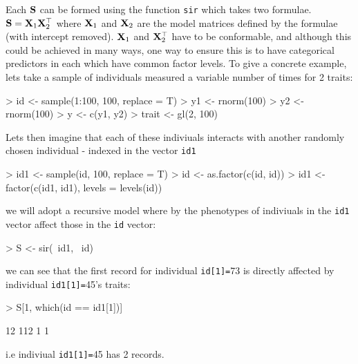 \documentclass{article}
\begin{document}
Each ${\bf S}$ can be formed using the function \texttt{sir} which takes two formulae. ${\bf S} = {\bf X}_{1}{\bf X}_{2}^{\top}$ where ${\bf X}_{1}$ and ${\bf X}_{2}$ are the model matrices defined by the formulae (with intercept removed).  ${\bf X}_{1}$ and ${\bf X}_{2}^{\top}$ have to be conformable, and although this could be achieved in many ways, one way to ensure this is to have categorical predictors in each which have common factor levels.  To give a concrete example, lets take a sample of individuals measured a variable number of times for 2 traits: 

\begin{Schunk}
\begin{Sinput}
> id <- sample(1:100, 100, replace = T)
> y1 <- rnorm(100)
> y2 <- rnorm(100)
> y <- c(y1, y2)
> trait <- gl(2, 100)
\end{Sinput}
\end{Schunk}


Lets then imagine that each of these indiviuals interacts with another randomly chosen individual - indexed in the vector \texttt{id1}

\begin{Schunk}
\begin{Sinput}
> id1 <- sample(id, 100, replace = T)
> id <- as.factor(c(id, id))
> id1 <- factor(c(id1, id1), levels = levels(id))
\end{Sinput}
\end{Schunk}

we will adopt a recursive model where by the phenotypes of indiviuals in the \texttt{id1} vector affect those in the \texttt{id} vector:

\begin{Schunk}
\begin{Sinput}
> S <- sir(~id1, ~id)
\end{Sinput}
\end{Schunk}

we can see that the first record for individual \texttt{id[1]=}73 is directly affected by individual \texttt{id1[1]=}45's traits:

\begin{Schunk}
\begin{Sinput}
> S[1, which(id == id1[1])]
\end{Sinput}
\begin{Soutput}
 12 112 
  1   1 
\end{Soutput}
\end{Schunk}

i.e indiviual  \texttt{id1[1]=}45 has 2 records.\\
\end{document}

